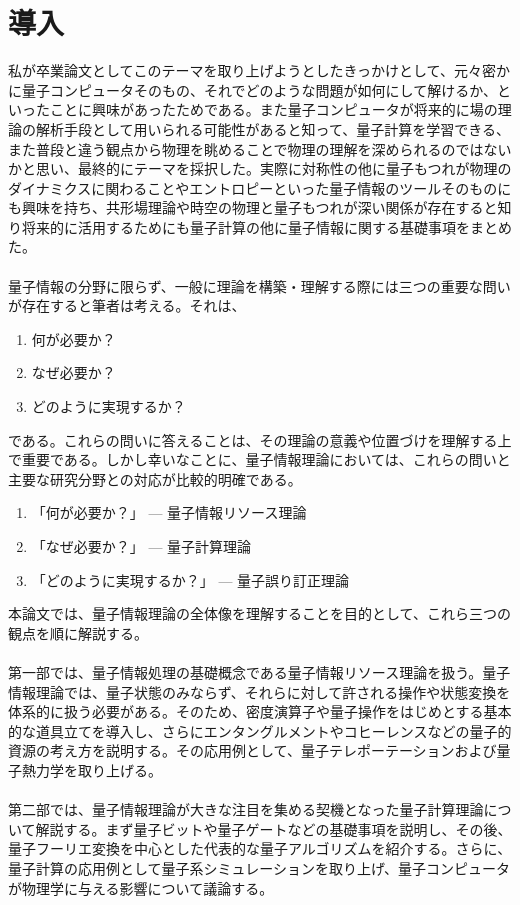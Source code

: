 \documentclass[a4paper,10.5pt]{article}
\numberwithin{equation}{section}
\begin{document}
\section{導入}
私が卒業論文としてこのテーマを取り上げようとしたきっかけとして、元々密かに量子コンピュータそのもの、それでどのような問題が如何にして解けるか、といったことに興味があったためである。また量子コンピュータが将来的に場の理論の解析手段として用いられる可能性があると知って、量子計算を学習できる、また普段と違う観点から物理を眺めることで物理の理解を深められるのではないかと思い、最終的にテーマを採択した。実際に対称性の他に量子もつれが物理のダイナミクスに関わることやエントロピーといった量子情報のツールそのものにも興味を持ち、共形場理論や時空の物理と量子もつれが深い関係が存在すると知り将来的に活用するためにも量子計算の他に量子情報に関する基礎事項をまとめた。\\
\\
量子情報の分野に限らず、一般に理論を構築・理解する際には三つの重要な問いが存在すると筆者は考える。それは、
\begin{enumerate}
\item 何が必要か？
\item なぜ必要か？
\item どのように実現するか？
\end{enumerate}
である。これらの問いに答えることは、その理論の意義や位置づけを理解する上で重要である。しかし幸いなことに、量子情報理論においては、これらの問いと主要な研究分野との対応が比較的明確である。
\begin{enumerate}
\item 「何が必要か？」 --- 量子情報リソース理論
\item 「なぜ必要か？」 --- 量子計算理論
\item 「どのように実現するか？」 --- 量子誤り訂正理論
\end{enumerate}
本論文では、量子情報理論の全体像を理解することを目的として、これら三つの観点を順に解説する。\\
\\
第一部では、量子情報処理の基礎概念である量子情報リソース理論を扱う。量子情報理論では、量子状態のみならず、それらに対して許される操作や状態変換を体系的に扱う必要がある。そのため、密度演算子や量子操作をはじめとする基本的な道具立てを導入し、さらにエンタングルメントやコヒーレンスなどの量子的資源の考え方を説明する。その応用例として、量子テレポーテーションおよび量子熱力学を取り上げる。\\
\\
第二部では、量子情報理論が大きな注目を集める契機となった量子計算理論について解説する。まず量子ビットや量子ゲートなどの基礎事項を説明し、その後、量子フーリエ変換を中心とした代表的な量子アルゴリズムを紹介する。さらに、量子計算の応用例として量子系シミュレーションを取り上げ、量子コンピュータが物理学に与える影響について議論する。\\
\end{document}
